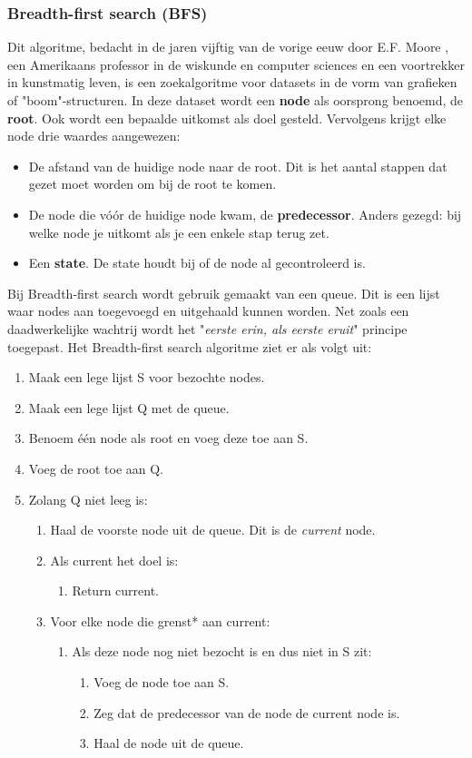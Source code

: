 \subsubsection{Breadth-first search (BFS)}
Dit algoritme, bedacht in de jaren vijftig van de vorige eeuw door E.F. Moore \cite{Moore}, een Amerikaans professor in de wiskunde en computer sciences en een voortrekker in kunstmatig leven, is een zoekalgoritme voor datasets in de vorm van grafieken of "boom"-structuren. In deze dataset wordt een \textbf{node} als oorsprong benoemd, de \textbf{root}. Ook wordt een bepaalde uitkomst als doel gesteld. Vervolgens krijgt elke node drie waardes aangewezen:
\begin{itemize}
\item De afstand van de huidige node naar de root. Dit is het aantal stappen dat gezet moet worden om bij de root te komen. 
\item De node die v\'{o}\'{o}r de huidige node kwam, de \textbf{predecessor}. Anders gezegd: bij welke node je uitkomt als je een enkele stap terug zet.
\item Een \textbf{state}. De state houdt bij of de node al gecontroleerd is.
\end{itemize}

Bij Breadth-first search wordt gebruik gemaakt van een queue. Dit is een lijst waar nodes aan toegevoegd en uitgehaald kunnen worden. Net zoals een daadwerkelijke wachtrij wordt het "\textit{eerste erin, als eerste eruit}" principe toegepast.
Het Breadth-first search algoritme ziet er als volgt uit:

\begin{enumerate}
\item Maak een lege lijst S voor bezochte nodes.
\item Maak een lege lijst Q met de queue.
\item Benoem \'e\'en node als root en voeg deze toe aan S.
\item Voeg de root toe aan Q. 
\item Zolang Q niet leeg is:
	\begin{enumerate}
	\item Haal de voorste node uit de queue. Dit is de \textit{current} node.
	\item Als current het doel is:
		\begin{enumerate}
		\item Return current.
		\end{enumerate}
	\item Voor elke node die grenst* aan current:
		\begin{enumerate}
		\item Als deze node nog niet bezocht is en dus niet in S zit:
			\begin{enumerate}
			\item Voeg de node toe aan S.
			\item Zeg dat de predecessor van de node de current node is.
			\item Haal de node uit de queue.
			\end{enumerate}
		\end{enumerate}
	\end{enumerate}
\end{enumerate}

